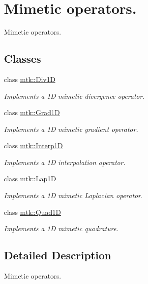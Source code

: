 \hypertarget{group__c07-mim__ops}{\section{Mimetic operators.}
\label{group__c07-mim__ops}
}


Mimetic operators.  


\subsection*{Classes}
\begin{DoxyCompactItemize}
\item 
class \hyperlink{classmtk_1_1Div1D}{mtk\-::\-Div1\-D}
\begin{DoxyCompactList}\small\item\em Implements a 1\-D mimetic divergence operator. \end{DoxyCompactList}\item 
class \hyperlink{classmtk_1_1Grad1D}{mtk\-::\-Grad1\-D}
\begin{DoxyCompactList}\small\item\em Implements a 1\-D mimetic gradient operator. \end{DoxyCompactList}\item 
class \hyperlink{classmtk_1_1Interp1D}{mtk\-::\-Interp1\-D}
\begin{DoxyCompactList}\small\item\em Implements a 1\-D interpolation operator. \end{DoxyCompactList}\item 
class \hyperlink{classmtk_1_1Lap1D}{mtk\-::\-Lap1\-D}
\begin{DoxyCompactList}\small\item\em Implements a 1\-D mimetic Laplacian operator. \end{DoxyCompactList}\item 
class \hyperlink{classmtk_1_1Quad1D}{mtk\-::\-Quad1\-D}
\begin{DoxyCompactList}\small\item\em Implements a 1\-D mimetic quadrature. \end{DoxyCompactList}\end{DoxyCompactItemize}


\subsection{Detailed Description}
Mimetic operators. 